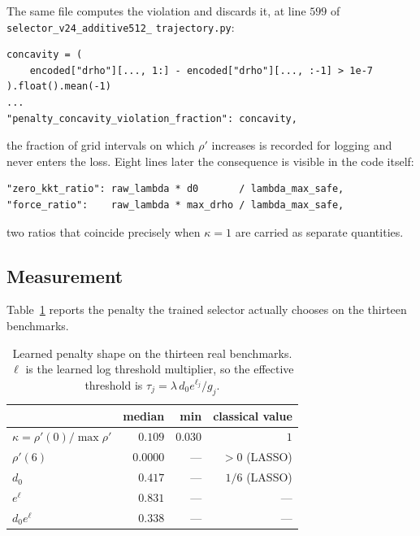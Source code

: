 \documentclass[11pt]{article}
\begin{document}
The same file computes the violation and discards it, at line $599$ of
\texttt{selector\_v24\_}\allowbreak\texttt{additive512\_}\allowbreak%
\texttt{trajectory.py}:

\begin{verbatim}
concavity = (
    encoded["drho"][..., 1:] - encoded["drho"][..., :-1] > 1e-7
).float().mean(-1)
...
"penalty_concavity_violation_fraction": concavity,
\end{verbatim}

\noindent the fraction of grid intervals on which $\rho'$ increases is
recorded for logging and never enters the loss. Eight lines later the
consequence is visible in the code itself:

\begin{verbatim}
"zero_kkt_ratio": raw_lambda * d0       / lambda_max_safe,
"force_ratio":    raw_lambda * max_drho / lambda_max_safe,
\end{verbatim}

\noindent two ratios that coincide precisely when $\kappa = 1$ are carried as
separate quantities.

\subsection{Measurement}

Table~\ref{tab:kappa} reports the penalty the trained selector actually
chooses on the thirteen benchmarks.

\begin{table}[h]
\centering
\caption{Learned penalty shape on the thirteen real benchmarks.
$\ell$ is the learned log threshold multiplier, so the effective threshold is
$\tau_j = \lambda\, d_0 e^{\ell_j} / g_j$.}
\label{tab:kappa}
\begin{tabular}{@{}lrrr@{}}
\toprule
 & median & min & classical value \\
\midrule
$\kappa = \rho'(0)/\max\rho'$ & $0.109$ & $0.030$ & $1$ \\
$\rho'(6)$                    & $0.0000$ & --- & $>0$ (LASSO) \\
$d_0$                         & $0.417$ & --- & $1/6$ (LASSO) \\
$e^{\ell}$                    & $0.831$ & --- & --- \\
$d_0 e^{\ell}$                & $0.338$ & --- & --- \\
\bottomrule
\end{tabular}
\end{table}
\end{document}
